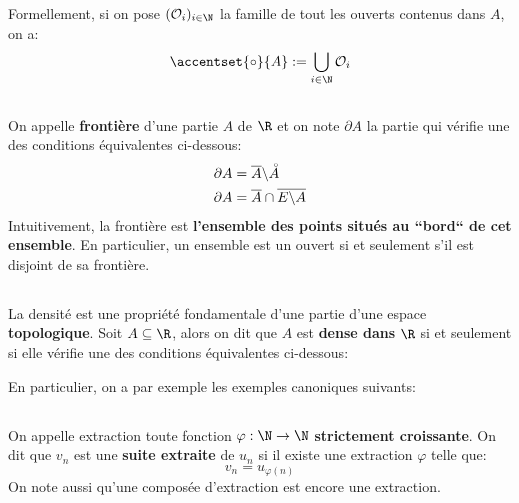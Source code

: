 Formellement, si on pose \((\mathcal{O}_i)_{i \in \N}\) la famille de tout les ouverts contenus dans \(A\), on a:
\[
    \accentset{\circ}{A} := \bigcup_{i \in \N} \mathcal{O}_i
\]

\subsection*{}
On appelle \textbf{frontière} d'une partie \(A\) de \(\R\) et on note \(\partial A\) la partie qui vérifie une des conditions équivalentes ci-dessous:
\begin{align*}
    \partial A &= \overline{A} \backslash \accentset{\circ}{A} \\
    \partial A &= \overline{A} \cap \overline{E \backslash A} \\    
\end{align*}
Intuitivement, la frontière est \textbf{l'ensemble des points situés au ``bord`` de cet ensemble}.\+
En particulier, un ensemble est un ouvert si et seulement s'il est disjoint de sa frontière.

\subsection*{}
La densité est une propriété fondamentale d'une partie d'une espace \textbf{topologique}.
Soit \(A \subseteq \R\), alors on dit que \(A\) est \textbf{dense dans} \(\R\) si et seulement si elle vérifie une des conditions équivalentes ci-dessous:
\pagebreak

En particulier, on a par exemple les exemples canoniques suivants:

\subsection*{}
On appelle extraction toute fonction \(\varphi : \N \rightarrow \N\) \textbf{strictement croissante}.\+
On dit que \(v_n\) est une \textbf{suite extraite} de \(u_n\) si il existe une extraction \(\varphi\) telle que:
\[
    v_n = u_{\varphi(n)}
\]
On note aussi qu'une composée d'extraction est encore une extraction.

